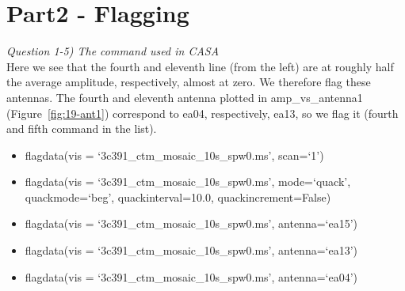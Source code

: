 \documentclass[12pt, a4paper]{article}
\begin{document}
\section{Part2 - Flagging}
\noindent \textit{Question 1-5) The command used in CASA} \\
Here we see that the fourth and eleventh line (from the left) are at roughly half the average amplitude, respectively, almost at zero. We therefore flag these antennas. The fourth and eleventh antenna plotted in amp\_vs\_antenna1 (Figure~\ref{fig:19-ant1}) correspond to ea04, respectively, ea13, so we flag it (fourth and fifth command in the list). \\
\begin{itemize}
    \item flagdata(vis = `3c391\_ctm\_mosaic\_10s\_spw0.ms', scan=`1')
    \item flagdata(vis = `3c391\_ctm\_mosaic\_10s\_spw0.ms', mode=`quack', quackmode=`beg', quackinterval=10.0, quackincrement=False)
    \item flagdata(vis = `3c391\_ctm\_mosaic\_10s\_spw0.ms', antenna=`ea15')
    \item flagdata(vis = `3c391\_ctm\_mosaic\_10s\_spw0.ms', antenna=`ea13')
    \item flagdata(vis = `3c391\_ctm\_mosaic\_10s\_spw0.ms', antenna=`ea04')
\end{itemize}
\end{document}
